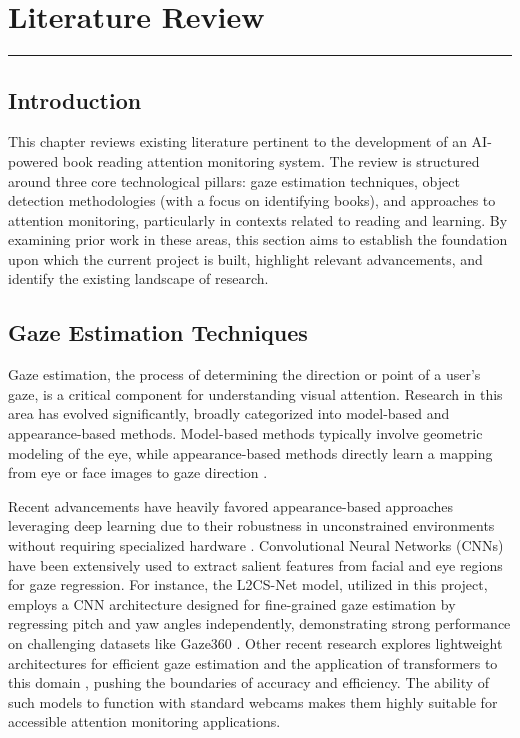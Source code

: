 \chapter{Literature Review} 
\vspace{-1.5cm}
\hspace{-1cm}\rule{19cm}{0.4pt} 

\normalsize

\section{Introduction}
This chapter reviews existing literature pertinent to the development of an AI-powered book reading attention monitoring system. The review is structured around three core technological pillars: gaze estimation techniques, object detection methodologies (with a focus on identifying books), and approaches to attention monitoring, particularly in contexts related to reading and learning. By examining prior work in these areas, this section aims to establish the foundation upon which the current project is built, highlight relevant advancements, and identify the existing landscape of research.

\section{Gaze Estimation Techniques}
Gaze estimation, the process of determining the direction or point of a user's gaze, is a critical component for understanding visual attention. Research in this area has evolved significantly, broadly categorized into model-based and appearance-based methods. Model-based methods typically involve geometric modeling of the eye, while appearance-based methods directly learn a mapping from eye or face images to gaze direction \cite{Cheng_GazeSurvey_2021}.

Recent advancements have heavily favored appearance-based approaches leveraging deep learning due to their robustness in unconstrained environments without requiring specialized hardware \cite{Kothari_GazeReviewDL_2024}. Convolutional Neural Networks (CNNs) have been extensively used to extract salient features from facial and eye regions for gaze regression. For instance, the L2CS-Net model, utilized in this project, employs a CNN architecture designed for fine-grained gaze estimation by regressing pitch and yaw angles independently, demonstrating strong performance on challenging datasets like Gaze360 \cite{L2CSNet2022}. Other recent research explores lightweight architectures for efficient gaze estimation \cite{Li_LightweightGaze_2023} and the application of transformers to this domain \cite{Huang_GazeEstimationTransformer_2023}, pushing the boundaries of accuracy and efficiency. The ability of such models to function with standard webcams makes them highly suitable for accessible attention monitoring applications.

